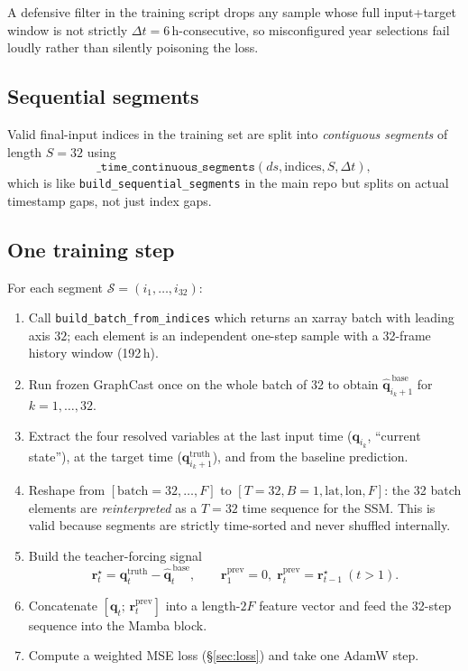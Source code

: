\documentclass[11pt,a4paper]{article}
\begin{document}
A defensive filter in the training script drops any sample whose full input+target window is not strictly $\Delta t = 6\,$h-consecutive, so misconfigured year selections fail loudly rather than silently poisoning the loss.

\subsection{Sequential segments}

Valid final-input indices in the training set are split into \emph{contiguous segments} of length $S = 32$ using
\[
\texttt{\_time\_continuous\_segments}(ds, \text{indices}, S, \Delta t),
\]
which is like \texttt{build\_sequential\_segments} in the main repo but splits on actual timestamp gaps, not just index gaps.

\subsection{One training step}

For each segment $\mathcal{S} = (i_1, \ldots, i_{32})$:
\begin{enumerate}[nosep]
  \item Call \texttt{build\_batch\_from\_indices} which returns an xarray batch with leading axis $32$; each element is an independent one-step sample with a 32-frame history window (192\,h).
  \item Run frozen GraphCast once on the whole batch of 32 to obtain $\widehat{\mathbf{q}}^{\,\text{base}}_{i_k+1}$ for $k = 1, \ldots, 32$.
  \item Extract the four resolved variables at the last input time ($\mathbf{q}_{i_k}$, ``current state''), at the target time ($\mathbf{q}^{\text{truth}}_{i_k+1}$), and from the baseline prediction.
  \item Reshape from $[\text{batch}=32, \ldots, F]$ to $[T=32, B=1, \mathrm{lat}, \mathrm{lon}, F]$: the 32 batch elements are \emph{reinterpreted} as a $T=32$ time sequence for the SSM. This is valid because segments are strictly time-sorted and never shuffled internally.
  \item Build the teacher-forcing signal
  \[
  \mathbf{r}^{\star}_t = \mathbf{q}^{\text{truth}}_t - \widehat{\mathbf{q}}^{\,\text{base}}_t, \qquad \mathbf{r}^{\text{prev}}_1 = 0, \; \mathbf{r}^{\text{prev}}_t = \mathbf{r}^{\star}_{t-1}\ (t>1).
  \]
  \item Concatenate $[\mathbf{q}_t;\,\mathbf{r}^{\text{prev}}_t]$ into a length-$2F$ feature vector and feed the 32-step sequence into the Mamba block.
  \item Compute a weighted MSE loss (\S\ref{sec:loss}) and take one AdamW step.
\end{enumerate}
\end{document}
